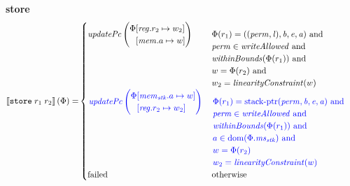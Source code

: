 \documentclass[a4paper]{article}
\newcommand{\sem}[1]{\left\llbracket #1 \right\rrbracket}
\newcommand{\dom}{\mathrm{dom}}
\newcommand{\tand}{\text{ and }}
\newcommand{\totherwise}{\text{otherwise }}
\newcommand{\sourcecolor}{\color{blue}}
\newcommand{\targetcolor}[1]{\color{black}}
\newcommand{\trg}[1]{{\targetcolor{} #1}}
\newcommand{\zinstr}[1]{\texttt{#1}}
\newcommand{\twoinstr}[3]{
  \ifthenelse{\equal{#2#3}{}}
  {\zinstr{#1}}
  {\zinstr{#1} \; #2 \; #3}
}
\newcommand{\tstore}[2]{\twoinstr{\trg{store}}{#1}{#2}}
\newcommand{\update}[2]{[#1 \mapsto #2]}
\newcommand{\updReg}[2]{\update{\reg.#1}{#2}}
\newcommand{\perm}{\var{perm}}
\newcommand{\lin}{\var{l}}
\newcommand{\stkptr}[1]{\mathrm{stack\text{-}ptr}(#1)}
\newcommand{\failed}{\mathrm{failed}}
\newcommand{\var}[1]{\mathit{#1}}
\newcommand{\reg}{\var{reg}}
\newcommand{\mem}{\var{mem}}
\newcommand{\ms}{\var{ms}}
\newcommand{\stk}{\var{stk}}
\newcommand{\baddr}{\var{b}}
\newcommand{\eaddr}{\var{e}}
\newcommand{\aaddr}{\var{a}}
\newcommand{\plainfun}[2]{
  \ifthenelse{\equal{#2}{}}
  {\mathit{#1}}
  {\mathit{#1}(#2)}
}
\newcommand{\updPcAddr}[1]{\plainfun{updatePc}{#1}}
\newcommand{\writeAllowed}[1]{\plainfun{writeAllowed}{#1}}
\newcommand{\linCons}[1]{\plainfun{linearityConstraint}{#1}}
\newcommand{\withinBounds}[1]{\plainfun{withinBounds}{#1}}
\begin{document}
\noindent\textbf{store}\\
\begin{align*}
  \sem{\tstore{r_1}{r_2}}(\Phi) = &
                                    \begin{cases}
                                      \updPcAddr{}\left(
                                        \arraycolsep=0pt
                                        \begin{array}{rl}
                                          \Phi&\updReg{r_2}{w_2}\\
                                              &\update{\mem.a}{w}
                                        \end{array}
\right) & 
                                      \arraycolsep=0pt
                                      \begin{array}[t]{l}
                                        \Phi(r_1) = ((\perm,\lin),\baddr,\eaddr,\aaddr) \tand \\
                                        \perm \in \writeAllowed{} \tand\\
                                        \withinBounds{\Phi(r_1)} \tand \\
                                        w = \Phi(r_2) \tand \\
                                        w_2 = \linCons{w}
                                      \end{array}
                                      \\
                                      \sourcecolor\left.
                                      \updPcAddr{}\left(
                                      \arraycolsep=0pt
                                      \begin{array}{rl}
                                        \Phi&\update{\mem_\stk.a}{w}\\
                                            &\updReg{r_2}{w_2}
                                      \end{array}
                                      \right) \right.& 
                                      \sourcecolor\left.
                                      \arraycolsep=0pt
                                      \begin{array}[t]{l}
                                        \Phi(r_1) = \stkptr{\perm,\baddr,\eaddr,\aaddr} \tand \\
                                        \perm \in \writeAllowed{} \tand \\
                                        \withinBounds{\Phi(r_1)} \tand \\
                                        a \in \dom(\Phi.\ms_\stk) \tand \\
                                        w = \Phi(r_2) \\
                                        w_2 = \linCons{w}
                                      \end{array}\right.\\
                                      \failed & \totherwise
                                    \end{cases}
\end{align*}
\end{document}
